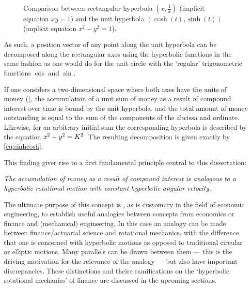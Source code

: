 \begin{figure}
    \centering
    \caption{Comparison between rectangular hyperbola $(x, \tfrac{1}{x})$ (implicit equation $xy= 1$) and the unit hyperbola $(\cosh(t), \sinh(t))$ (implicit equation $x^2 - y^2 = 1$).}
\end{figure}

As such, a position vector of any point along the unit hyperbola can be decomposed along the rectangular axes using the hyperbolic functions in the same fashion as one would do for the unit circle with the `regular' trigonometric functions $\cos$ and $\sin$.


If one considers a two-dimensional space where both axes have the units of money (\si{\money}), the accumulation of a unit sum of money as a result of compound interest over time is bound by the unit hyperbola, and the total amount of money outstanding is equal to the sum of the components of the abcissa and ordinate. Likewise, for an arbitrary initial sum \ininv the corresponding hyperbola is described by the equation $x^2 - y^2 = K^2$. The resulting decomposition is given exactly by \cref{eq:sinhcosh}.

This finding giver rise to a first fundamental principle central to this dissertation:

\textit{
The accumulation of money as a result of compound interest is analogous to a hyperbolic rotational motion with constant hyperbolic angular velocity.}

The ultimate purpose of this concept is , as is customary in the field of economic engineering, to establish useful analogies between concepts from economics or finance and (mechanical) engineering. In this case an analogy can be made between finance/actuarial science and rotational mechanics, with the difference that one is concerned with hyperbolic motions as opposed to traditional circular or elliptic motions. Many parallels can be drawn between them --- this is the driving motivation for the relevance of the analogy --- but also have important discrepancies. These distinctions and theire ramifications on the `hyperbolic rotational mechanics' of finance are discussed in the upcoming sections.

